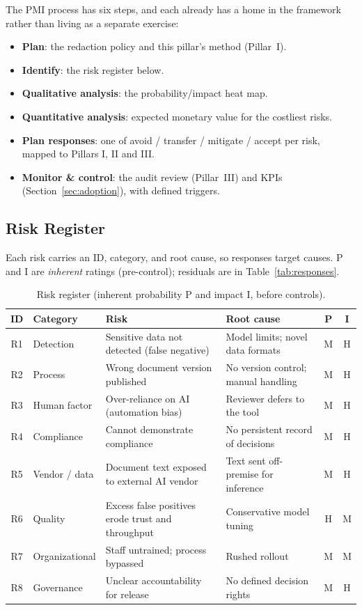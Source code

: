 \documentclass[12pt,a4paper]{article}
\begin{document}
The PMI process has six steps, and each already has a home in the framework rather than living as a separate exercise:

\begin{itemize}
  \item \textbf{Plan}: the redaction policy and this pillar's method (Pillar~I).
  \item \textbf{Identify}: the risk register below.
  \item \textbf{Qualitative analysis}: the probability/impact heat map.
  \item \textbf{Quantitative analysis}: expected monetary value for the costliest risks.
  \item \textbf{Plan responses}: one of avoid / transfer / mitigate / accept per risk, mapped to Pillars I, II and III.
  \item \textbf{Monitor \& control}: the audit review (Pillar~III) and KPIs (Section~\ref{sec:adoption}), with defined triggers.
\end{itemize}

\subsection{Risk Register}

Each risk carries an ID, category, and root cause, so responses target causes. P and I are \emph{inherent} ratings (pre-control); residuals are in Table~\ref{tab:responses}.

\begin{table}[H]
\centering
\small
{}
\begin{tabular}{@{} c p{2.2cm} p{3.8cm} p{3.8cm} c c @{}}
\toprule
\textbf{\color{accentdark}ID} & \textbf{\color{accentdark}Category} & \textbf{\color{accentdark}Risk} & \textbf{\color{accentdark}Root cause} & \textbf{\color{accentdark}P} & \textbf{\color{accentdark}I} \\
\midrule
R1 & Detection & Sensitive data not detected (false negative) & Model limits; novel data formats & M & H \\
R2 & Process & Wrong document version published & No version control; manual handling & M & H \\
R3 & Human factor & Over-reliance on AI (automation bias) & Reviewer defers to the tool & M & H \\
R4 & Compliance & Cannot demonstrate compliance & No persistent record of decisions & M & H \\
R5 & Vendor / data & Document text exposed to external AI vendor & Text sent off-premise for inference & M & H \\
R6 & Quality & Excess false positives erode trust and throughput & Conservative model tuning & H & M \\
R7 & Organizational & Staff untrained; process bypassed & Rushed rollout & M & M \\
R8 & Governance & Unclear accountability for release & No defined decision rights & M & H \\
\bottomrule
\end{tabular}
\caption{Risk register (inherent probability P and impact I, before controls).}
\label{tab:riskregister}
\end{table}
\end{document}
